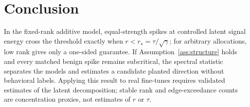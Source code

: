 \documentclass[11pt]{article}
\theoremstyle{definition}
\theoremstyle{remark}
\begin{document}
\section{Conclusion}
\label{sec:conclusion}

In the fixed-rank additive model, equal-strength spikes at controlled latent signal energy
cross the threshold exactly when $r<r_\star=\tau/\sqrt\gamma$; for arbitrary allocations,
low rank gives only a one-sided guarantee. If Assumption~\ref{ass:structure} holds and every
matched benign spike remains subcritical, the spectral statistic separates the models and
estimates a candidate planted direction without behavioral labels. Applying this result to
real fine-tunes requires validated estimates of the latent decomposition; stable rank and
edge-exceedance counts are concentration proxies, not estimates of $r$ or $\tau$.
\end{document}
